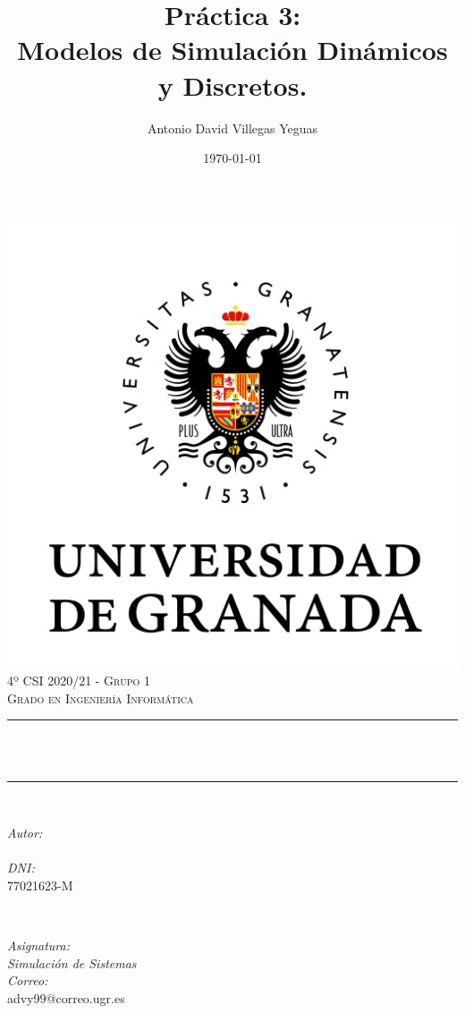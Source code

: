 \documentclass[12pt, spanish]{article}
\title{Práctica 3:\\
Modelos de Simulación Dinámicos y Discretos.\hspace{0.05cm} }
\author{Antonio David Villegas Yeguas}
\date{\today}
\makeatletter
\let\thetitle\@title
\let\theauthor\@author
\makeatother
\begin{document}

\begin{titlepage}
    \centering
    \vspace*{0.3 cm}
    \includegraphics[scale = 0.50]{ugr.png}\\[0.7 cm]
    \textsc{\large 4º CSI 2020/21 - Grupo 1}\\[0.5 cm]
    \textsc{\large Grado en Ingeniería Informática}\\[0.5 cm]
    \rule{\linewidth}{0.2 mm} \\[0.2 cm]
    { \huge \bfseries \thetitle}\\
    \rule{\linewidth}{0.2 mm} \\[1 cm]

    \begin{minipage}{0.4\textwidth}
        \begin{flushleft} \large
            \emph{Autor:}\\
            \theauthor\\
			 \emph{DNI:}\\
            77021623-M
            \end{flushleft}
            \end{minipage}~
            \begin{minipage}{0.4\textwidth}
            \begin{flushright} \large
            \emph{Asignatura: \\
            Simulación de Sistemas}   \\
            \emph{Correo:}\\
            advy99@correo.ugr.es
        \end{flushright}
    \end{minipage}\\[0.5cm]


\end{titlepage}
\end{document}
